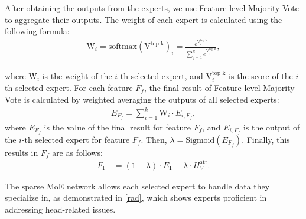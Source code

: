 \documentclass[11pt]{article}
\begin{document}
After obtaining the outputs from the experts, we use Feature-level Majority Vote to aggregate their outputs.
The weight of each expert is calculated using the following formula:
\begin{align}
    \text{W}_i = \text{softmax}(\text{V}^{\text{top k}})_i = \frac{e^{\text{V}^{\text{top k}}_i}}{\sum_{j=1}^{k} e^{\text{V}^{\text{top k}}_j}},
\end{align}


where \(\text{W}_i\) is the weight of the \(i\)-th selected expert, and \(\text{V}^{\text{top k}}_i\) is the score of the \(i\)-th selected expert.
For each feature \( F_f \), the final result of Feature-level Majority Vote is calculated by weighted averaging the outputs of all selected experts:
\begin{align}
    {E}_{F_f} = \sum_{i=1}^{k} \text{W}_i \cdot E_{i, F_f} ,
\end{align}
where \({E}_{F_f}\) is the value of the final result for feature \( F_f \), and \(E_{i, F_f}\) is the output of the \(i\)-th selected expert for feature \( F_f \). Then,
\(\lambda = \text{Sigmoid}({E}_{F_f}) \).
Finally, this results in \( F_f \) are as follows:
\begin{align}
    F_{\text{F}} &= (1-\lambda) \cdot F_{\text{T}} + \lambda \cdot H_{V}^{\text{att}}.
\end{align}


The sparse MoE network allows each selected expert to handle data they specialize in, as demonstrated in \autoref{rad}, which shows experts proficient in addressing head-related issues.
\end{document}
